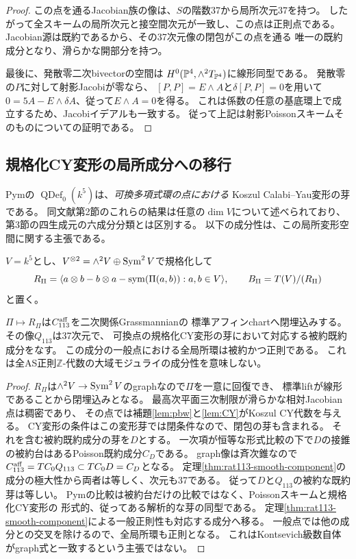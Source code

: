 \begin{proof}
この点を通るJacobian族の像は、$S$の階数37から局所次元37を持つ。
したがって全スキームの局所次元と接空間次元が一致し、この点は正則点である。
Jacobian源は既約であるから、その37次元像の閉包がこの点を通る
唯一の既約成分となり、滑らかな開部分を持つ。

最後に、発散零二次bivectorの空間は
$H^0(\mathbb P^4,\wedge^2T_{\mathbb P^4})$に線形同型である。
発散零の$P$に対して射影Jacobiが零なら、
$[P,P]=E\wedge A$と$\delta[P,P]=0$を用いて
$0=5A-E\wedge\delta A$、従って$E\wedge A=0$を得る。
これは係数の任意の基底環上で成立するため、Jacobiイデアルも一致する。
従って上記は射影Poissonスキームそのものについての証明である。
\end{proof}

\subsection{規格化CY変形の局所成分への移行}
Pym\cite[Definition 2.8, Proposition 2.9, Theorem 2.10]{Pym}の
$\operatorname{QDef}_0(k^5)$は、\emph{可換多項式環の点における}
Koszul Calabi--Yau変形の芽である。
同文献第2節のこれらの結果は任意の$\dim V$について述べられており、
第3節の四生成元の六成分分類とは区別する。
以下の成分性は、この局所変形空間に関する主張である。

$V=k^5$とし、$V^{\otimes2}=\wedge^2V\oplus\operatorname{Sym}^2V$で規格化して
\[
 R_\Pi=\langle a\otimes b-b\otimes a-\operatorname{sym}(\Pi(a,b)):a,b\in V\rangle,
 \qquad B_\Pi=T(V)/(R_\Pi)
\]
と置く。
\begin{proposition}[graph成分と一般被約性]\label{prop:quantum-113-component}
$\Pi\mapsto R_\Pi$は$C_{113}^{\rm aff}$を二次関係Grassmannianの
標準アフィンchartへ閉埋込みする。その像$Q_{113}$は37次元で、
可換点の規格化CY変形の芽において対応する被約既約成分をなす。
この成分の一般点における全局所環は被約かつ正則である。
これは全AS正則$\mathbb Z$-代数の大域モジュライの成分性を意味しない。
\end{proposition}
\begin{proof}
$R_\Pi$は$\wedge^2V\to\operatorname{Sym}^2V$のgraphなので$\Pi$を一意に回復でき、
標準liftが線形であることから閉埋込みとなる。
最高次平面三次制限が滑らかな相対Jacobian点は稠密であり、
その点では補題\ref{lem:pbw}と\ref{lem:CY}がKoszul CY代数を与える。
CY変形の条件はこの変形芽では閉条件なので、閉包の芽も含まれる。
それを含む被約既約成分の芽を$D$とする。
一次項が恒等な形式比較の下で$D$の接錐の被約台はあるPoisson既約成分$C_D$である。
graph像は斉次錐なので
$C_{113}^{\rm aff}=TC_0Q_{113}\subset TC_0D=C_D$となる。
定理\ref{thm:rat113-smooth-component}の成分の極大性から両者は等しく、次元も37である。
従って$D$と$Q_{113}$の被約な既約芽は等しい。
Pymの比較は被約台だけの比較ではなく、Poissonスキームと規格化CY変形の
形式的、従ってある解析的な芽の同型である。
定理\ref{thm:rat113-smooth-component}による一般正則性も対応する成分へ移る。
一般点では他の成分との交叉を除けるので、全局所環も正則となる。
これはKontsevich級数自体がgraph式と一致するという主張ではない。
\end{proof}

